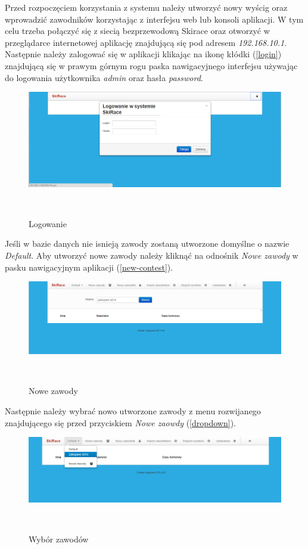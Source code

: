\documentclass[11pt,a4paper, twoside]{article}
\begin{document}
Przed rozpoczęciem korzystania z systemu należy utworzyć nowy wyścig oraz wprowadzić zawodników korzystając z interfejsu web lub konsoli aplikacji. W tym celu trzeba połączyć się z siecią bezprzewodową Skirace oraz otworzyć w przeglądarce internetowej aplikację znajdującą się pod adresem \emph{192.168.10.1}. Następnie należy zalogować się w aplikacji klikając na ikonę kłódki (\ref{login}) znajdującą się w prawym górnym rogu paska nawigacyjnego interfejsu używając do logowania użytkownika \emph{admin} oraz hasła \emph{password}.
\begin{figure}[H]
\centering
\includegraphics[scale=0.3]{./img/login.png}
\caption{Logowanie}
$\label{login}$
\end{figure}
\noindent
Jeśli w bazie danych nie isnieją zawody zostaną utworzone domyślne o nazwie \emph{Default}. Aby utworzyć nowe zawody należy kliknąć na odnośnik \emph{Nowe zawody} w pasku nawigacyjnym aplikacji (\ref{new-contest}). 	
\begin{figure}[H]
\centering
\includegraphics[scale=0.3]{./img/new-contest.png}
\caption{Nowe zawody}
$\label{new-contest}$
\end{figure}
\noindent
Następnie należy wybrać nowo utworzone zawody z menu rozwijanego znajdującego się przed przyciskiem \emph{Nowe zaowdy} (\ref{dropdown}).
\begin{figure}[H]
\centering
\includegraphics[scale=0.3]{./img/dropdown.png}
\caption{Wybór zawodów}
$\label{dropdown}$
\end{figure}
\end{document}
